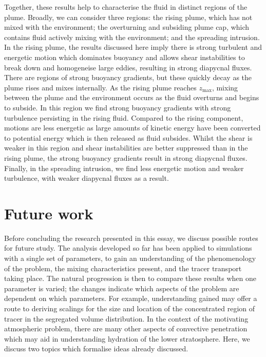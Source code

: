 \documentclass[a4paper]{article}
\begin{document}
Together, these results help to characterise the fluid in distinct regions of the plume. Broadly, we can
consider three regions: the rising plume, which has not mixed with the environment; the overturning and
subsiding plume cap, which contains fluid actively mixing with the environment; and the spreading intrusion.
In the rising plume, the results discussed here imply there is strong turbulent and energetic motion which
dominates buoyancy and allows shear instabilities to break down and homogeneise large eddies, resulting in
strong diapycnal fluxes. There are regions of strong buoyancy gradients, but these quickly decay as the plume
rises and mixes internally. As the rising plume reaches $z_{\max}$, mixing between the plume and the
environment occurs as the fluid overturns and begins to subside. In this region we find strong buoyancy
gradients with strong turbulence persisting in the rising fluid. Compared to the rising component, motions are
less energetic as large amounts of kinetic energy have been converted to potential energy which is then
released as fluid subsides. Whilst the shear is weaker in this region and shear instabilities are better
suppressed than in the rising plume, the strong buoyancy gradients result in strong diapycnal fluxes.
Finally, in the spreading intrusion, we find less energetic motion and weaker turbulence, with weaker
diapycnal fluxes as a result.


\section{Future work}

Before concluding the research presented in this essay, we discuss possible routes for future study. The
analysis developed so far has been applied to simulations with a single set of parameters, to gain an
understanding of the phenomenology of the problem, the mixing characteristics present, and the tracer
transport taking place. The natural progression is then to compare these results when one parameter is
varied; the changes indicate which aspects of the problem are dependent on which parameters. For example,
understanding gained may offer a route to deriving scalings for the size and location of the concentrated
region of tracer in the segregated volume distribution. In the context of the motivating atmospheric problem,
there are many other aspects of convective penetration which may aid in understanding hydration of the
lower stratosphere. Here, we discuss two topics which formalise ideas already discussed. 
\end{document}
